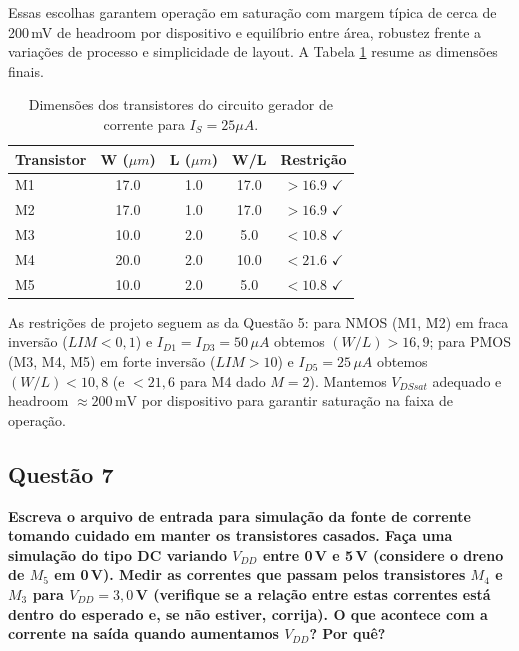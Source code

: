 \documentclass[12pt,a4paper]{article}
\begin{document}
Essas escolhas garantem operação em saturação com margem típica de cerca de 200\,mV de headroom por dispositivo e equilíbrio entre área, robustez frente a variações de processo e simplicidade de layout. A Tabela \ref{tab:dimensoes} resume as dimensões finais.

\begin{table}[H]
\centering
\caption{Dimensões dos transistores do circuito gerador de corrente para $I_S = 25\mu A$.}
\label{tab:dimensoes}
\begin{tabular}{@{}lcccc@{}}
    \toprule
    \textbf{Transistor} & \textbf{W ($\mu m$)} & \textbf{L ($\mu m$)} & \textbf{W/L} & \textbf{Restrição} \\\midrule
M1 & 17.0 & 1.0 & 17.0 & $> 16.9$ $\checkmark$ \\
M2 & 17.0 & 1.0 & 17.0 & $> 16.9$ $\checkmark$ \\
M3 & 10.0 & 2.0 & 5.0 & $< 10.8$ $\checkmark$ \\
M4 & 20.0 & 2.0 & 10.0 & $< 21.6$ $\checkmark$ \\
M5 & 10.0 & 2.0 & 5.0 & $< 10.8$ $\checkmark$ \\
\bottomrule
\end{tabular}
\end{table}

As restrições de projeto seguem as da Questão 5: para NMOS (M1, M2) em fraca inversão ($LIM<0{,}1$) e $I_{D1}=I_{D3}=50\,\mu A$ obtemos $(W/L)>16{,}9$; para PMOS (M3, M4, M5) em forte inversão ($LIM>10$) e $I_{D5}=25\,\mu A$ obtemos $(W/L)<10{,}8$ (e $<21{,}6$ para M4 dado $M=2$). Mantemos $V_{DSsat}$ adequado e headroom $\approx 200\,\text{mV}$ por dispositivo para garantir saturação na faixa de operação.

\subsection*{Questão 7}
\begin{BoxQ}
	\textbf{Escreva o arquivo de entrada para simulação da fonte de corrente tomando cuidado em manter os transistores casados. Faça uma simulação do tipo DC variando $V_{DD}$ entre 0\,V e 5\,V (considere o dreno de $M_{5}$ em 0\,V). Medir as correntes que passam pelos transistores $M_{4}$ e $M_{3}$ para $V_{DD} = 3{,}0$\,V (verifique se a relação entre estas correntes está dentro do esperado e, se não estiver, corrija). O que acontece com a corrente na saída quando aumentamos $V_{DD}$? Por quê?}
\end{BoxQ}\par
\end{document}

